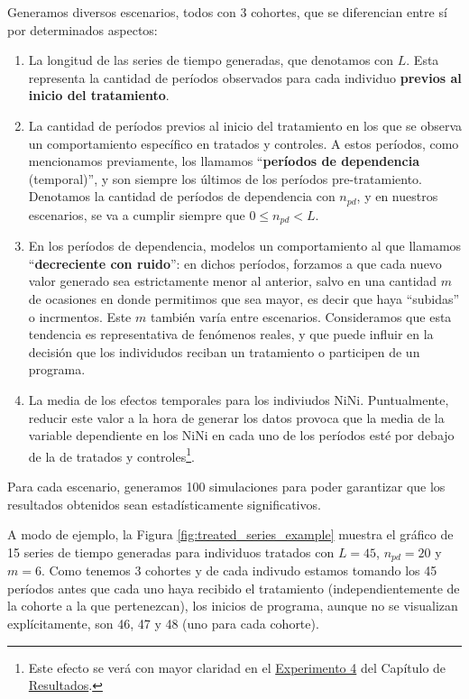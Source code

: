 \documentclass[../../main.tex]{subfiles}
\begin{document}
Generamos diversos escenarios, todos con 3 cohortes, que se diferencian entre sí por
determinados aspectos:
\begin{enumerate}[itemsep=0.05cm, label=\textbf{\arabic*.}]
    \item La longitud de las series de tiempo generadas, que denotamos con \(L\). Esta
    representa la cantidad de períodos observados para cada individuo \textbf{previos al inicio
    del tratamiento}.
    \item La cantidad de períodos previos al inicio del tratamiento en los que se observa
    un comportamiento específico en tratados y controles. A estos períodos, como
    mencionamos previamente, los llamamos ``\textbf{períodos de dependencia} (temporal)'',
    y son siempre los últimos de los períodos pre-tratamiento. Denotamos la cantidad de
    períodos de dependencia con \(n_{pd}\), y en nuestros escenarios, se va a cumplir
    siempre que \(0 \le n_{pd} < L\).
    \item En los períodos de dependencia, modelos un comportamiento al que llamamos
    ``\textbf{decreciente con ruido}'': en dichos períodos, forzamos a que cada nuevo
    valor generado sea estrictamente menor al anterior, salvo en una cantidad \(m\) de
    ocasiones en donde permitimos que sea mayor, es decir que haya ``subidas'' o
    incrmentos. Este \(m\) también varía entre escenarios. Consideramos que esta tendencia
    es representativa de fenómenos reales, y que puede influir en la decisión que los
    individudos reciban un tratamiento o participen de un programa.
    \item La media de los efectos temporales para los indiviudos NiNi. Puntualmente,
    reducir este valor a la hora de generar los datos provoca que la media de la variable
    dependiente en los NiNi en cada uno de los períodos esté por debajo de la de tratados
    y controles\footnote{Este efecto se verá con mayor claridad en el
    \hyperref[sec:exp4]{Experimento 4} del Capítulo de
    \hyperref[chap:resultados]{Resultados}.}.
\end{enumerate}
Para cada escenario, generamos 100 simulaciones para poder garantizar que los resultados
obtenidos sean estadísticamente significativos.

A modo de ejemplo, la Figura \ref{fig:treated_series_example} muestra el gráfico de 15
series de tiempo generadas para individuos tratados con \(L=45\), \(n_{pd}=20\) y \(m=6\).
Como tenemos 3 cohortes y de cada indivudo estamos tomando los 45 períodos antes que cada
uno haya recibido el tratamiento (independientemente de la cohorte a la que pertenezcan),
los inicios de programa, aunque no se visualizan explícitamente, son 46, 47 y 48 (uno para
cada cohorte).
\end{document}
